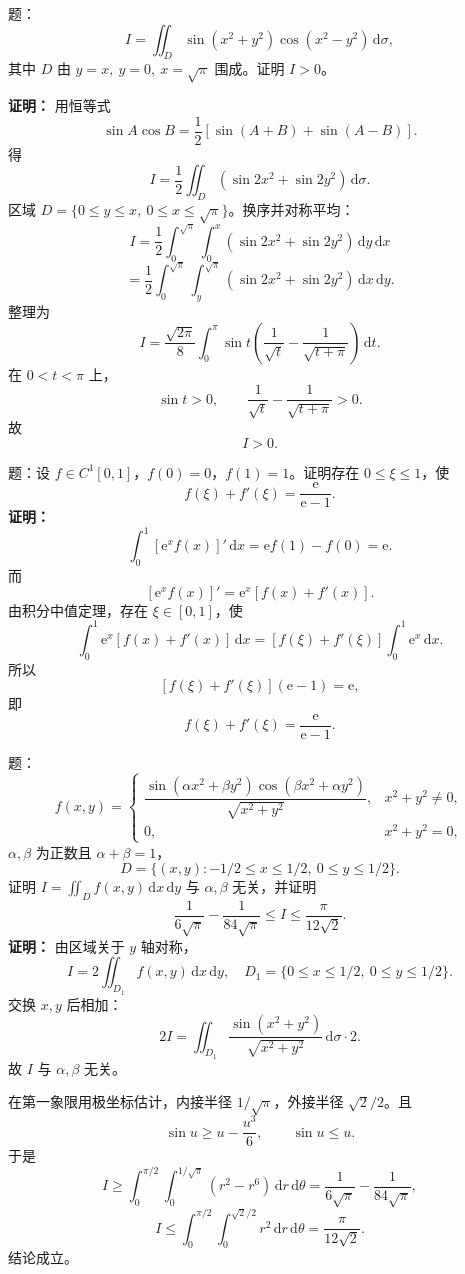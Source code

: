 \documentclass[11pt,a4paper,UTF8]{ctexart}
\newcommand{\dd}{\,\mathrm d}
\newcommand{\ee}{\mathrm e}
\begin{document}
\begin{answerbox}
题：
\[
I=\iint_D\sin(x^2+y^2)\cos(x^2-y^2)\dd\sigma,
\]
其中 \(D\) 由 \(y=x,\ y=0,\ x=\sqrt\pi\) 围成。证明 \(I>0\)。

\textbf{证明：}
用恒等式
\[
\sin A\cos B=\frac12[\sin(A+B)+\sin(A-B)].
\]
得
\[
I=\frac12\iint_D(\sin2x^2+\sin2y^2)\dd\sigma.
\]
区域 \(D=\{0\le y\le x,\ 0\le x\le\sqrt\pi\}\)。换序并对称平均：
\[
I=\frac12\int_0^{\sqrt\pi}\int_0^x(\sin2x^2+\sin2y^2)\dd y\dd x
\]
\[
=\frac12\int_0^{\sqrt\pi}\int_y^{\sqrt\pi}(\sin2x^2+\sin2y^2)\dd x\dd y.
\]
整理为
\[
I=\frac{\sqrt{2\pi}}8\int_0^\pi
\sin t\left(\frac1{\sqrt t}-\frac1{\sqrt{t+\pi}}\right)\dd t.
\]
在 \(0<t<\pi\) 上，
\[
\sin t>0,\qquad \frac1{\sqrt t}-\frac1{\sqrt{t+\pi}}>0.
\]
故
\[
\boxed{I>0}.
\]
\end{answerbox}

\begin{answerbox}
题：设 \(f\in C^1[0,1]\)，\(f(0)=0\)，\(f(1)=1\)。证明存在 \(0\le\xi\le1\)，使
\[
f(\xi)+f'(\xi)=\frac{\ee}{\ee-1}.
\]
\textbf{证明：}
\[
\int_0^1[\ee^xf(x)]'\dd x
=\ee f(1)-f(0)=\ee.
\]
而
\[
[\ee^xf(x)]'=\ee^x[f(x)+f'(x)].
\]
由积分中值定理，存在 \(\xi\in[0,1]\)，使
\[
\int_0^1\ee^x[f(x)+f'(x)]\dd x
=[f(\xi)+f'(\xi)]\int_0^1\ee^x\dd x.
\]
所以
\[
[f(\xi)+f'(\xi)](\ee-1)=\ee,
\]
即
\[
\boxed{f(\xi)+f'(\xi)=\frac{\ee}{\ee-1}}.
\]
\end{answerbox}

\begin{answerbox}
题：
\[
f(x,y)=
\begin{cases}
\dfrac{\sin(\alpha x^2+\beta y^2)\cos(\beta x^2+\alpha y^2)}
{\sqrt{x^2+y^2}},&x^2+y^2\ne0,\\
0,&x^2+y^2=0,
\end{cases}
\]
\(\alpha,\beta\) 为正数且 \(\alpha+\beta=1\)，
\[
D=\{(x,y):-1/2\le x\le1/2,\ 0\le y\le1/2\}.
\]
证明 \(I=\iint_Df(x,y)\dd x\dd y\) 与 \(\alpha,\beta\) 无关，并证明
\[
\frac{1}{6\sqrt\pi}-\frac{1}{84\sqrt\pi}
\le I\le \frac{\pi}{12\sqrt2}.
\]
\textbf{证明：}
由区域关于 \(y\) 轴对称，
\[
I=2\iint_{D_1}f(x,y)\dd x\dd y,\quad
D_1=\{0\le x\le1/2,\ 0\le y\le1/2\}.
\]
交换 \(x,y\) 后相加：
\[
2I=\iint_{D_1}
\frac{\sin(x^2+y^2)}{\sqrt{x^2+y^2}}\dd\sigma\cdot 2.
\]
故 \(I\) 与 \(\alpha,\beta\) 无关。

在第一象限用极坐标估计，内接半径 \(1/\sqrt\pi\)，外接半径 \(\sqrt2/2\)。且
\[
\sin u\ge u-\frac{u^3}{6},\qquad \sin u\le u.
\]
于是
\[
I\ge \int_0^{\pi/2}\int_0^{1/\sqrt\pi}(r^2-r^6) \dd r\dd\theta
=\frac{1}{6\sqrt\pi}-\frac{1}{84\sqrt\pi},
\]
\[
I\le \int_0^{\pi/2}\int_0^{\sqrt2/2}r^2\dd r\dd\theta
=\frac{\pi}{12\sqrt2}.
\]
结论成立。
\end{answerbox}
\end{document}
